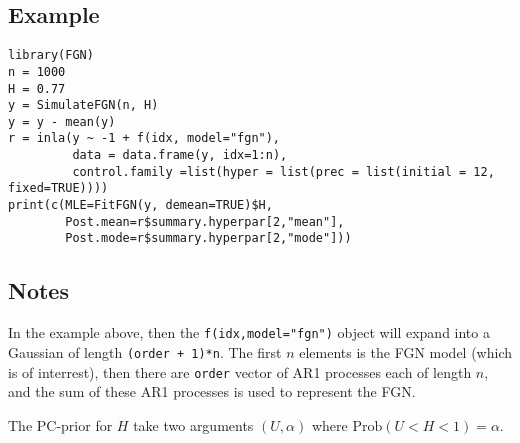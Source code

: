 \documentclass[a4paper,11pt]{article}
\begin{document}
\subsection*{Example}

\begin{verbatim}
library(FGN)
n = 1000
H = 0.77
y = SimulateFGN(n, H)
y = y - mean(y)
r = inla(y ~ -1 + f(idx, model="fgn"), 
         data = data.frame(y, idx=1:n),
         control.family =list(hyper = list(prec = list(initial = 12, fixed=TRUE))))
print(c(MLE=FitFGN(y, demean=TRUE)$H,
        Post.mean=r$summary.hyperpar[2,"mean"],
        Post.mode=r$summary.hyperpar[2,"mode"]))
\end{verbatim}


\subsection*{Notes}

In the example above, then the \texttt{f(idx,model="fgn")} object will
expand into a Gaussian of length \texttt{(order + 1)*n}. The first $n$
elements is the FGN model (which is of interrest), then there are
\texttt{order} vector of AR1 processes each of length $n$, and the sum
of these AR1 processes is used to represent the FGN.

The PC-prior for $H$ take two arguments $(U, \alpha)$ where
$\text{Prob}(U < H < 1) = \alpha$.
\end{document}
